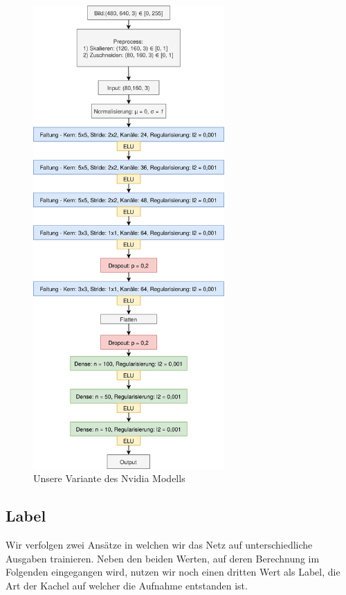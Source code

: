 \begin{figure}[H]
	\centering
	\includegraphics[width=0.65\textwidth]{kapitel4/images/drawio.png}
	\caption{Unsere Variante des Nvidia Modells}
	\label{nvidia-model}
	\vspace{0.2cm}
\end{figure}

\subsection{Label}

Wir verfolgen zwei Ansätze in welchen wir das Netz auf unterschiedliche Ausgaben trainieren. Neben den beiden Werten, auf deren Berechnung im Folgenden eingegangen wird, nutzen wir noch einen dritten Wert als Label, die Art der Kachel auf welcher die Aufnahme entstanden ist. \\

